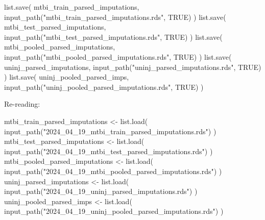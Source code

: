 \documentclass[
  letterpaper,
  DIV=11,
  numbers=noendperiod]{scrreprt}
\newenvironment{Shaded}{\begin{snugshade}}{\end{snugshade}}
\newcommand{\ConstantTok}[1]{\textcolor[rgb]{0.56,0.35,0.01}{#1}}
\newcommand{\FunctionTok}[1]{\textcolor[rgb]{0.28,0.35,0.67}{#1}}
\newcommand{\NormalTok}[1]{\textcolor[rgb]{0.00,0.23,0.31}{#1}}
\newcommand{\OtherTok}[1]{\textcolor[rgb]{0.00,0.23,0.31}{#1}}
\newcommand{\StringTok}[1]{\textcolor[rgb]{0.13,0.47,0.30}{#1}}
\begin{document}
\begin{Shaded}
\begin{Highlighting}[]
\FunctionTok{list.save}\NormalTok{(}
\NormalTok{    mtbi\_train\_parsed\_imputations,}
    \FunctionTok{input\_path}\NormalTok{(}\StringTok{"mtbi\_train\_parsed\_imputations.rds"}\NormalTok{, }\ConstantTok{TRUE}\NormalTok{)}
\NormalTok{)}
\FunctionTok{list.save}\NormalTok{(}
\NormalTok{    mtbi\_test\_parsed\_imputations,}
    \FunctionTok{input\_path}\NormalTok{(}\StringTok{"mtbi\_test\_parsed\_imputations.rds"}\NormalTok{, }\ConstantTok{TRUE}\NormalTok{)}
\NormalTok{)}
\FunctionTok{list.save}\NormalTok{(}
\NormalTok{    mtbi\_pooled\_parsed\_imputations,}
    \FunctionTok{input\_path}\NormalTok{(}\StringTok{"mtbi\_pooled\_parsed\_imputations.rds"}\NormalTok{, }\ConstantTok{TRUE}\NormalTok{)}
\NormalTok{)}
\FunctionTok{list.save}\NormalTok{(}
\NormalTok{    uninj\_parsed\_imputations,}
    \FunctionTok{input\_path}\NormalTok{(}\StringTok{"uninj\_parsed\_imputations.rds"}\NormalTok{, }\ConstantTok{TRUE}\NormalTok{)}
\NormalTok{)}
\FunctionTok{list.save}\NormalTok{(}
\NormalTok{    uninj\_pooled\_parsed\_imps,}
    \FunctionTok{input\_path}\NormalTok{(}\StringTok{"uninj\_pooled\_parsed\_imputations.rds"}\NormalTok{, }\ConstantTok{TRUE}\NormalTok{)}
\NormalTok{)}
\end{Highlighting}
\end{Shaded}

Re-reading:

\begin{Shaded}
\begin{Highlighting}[]
\NormalTok{mtbi\_train\_parsed\_imputations }\OtherTok{\textless{}{-}} \FunctionTok{list.load}\NormalTok{(}
    \FunctionTok{input\_path}\NormalTok{(}\StringTok{"2024\_04\_19\_mtbi\_train\_parsed\_imputations.rds"}\NormalTok{)}
\NormalTok{)}
\NormalTok{mtbi\_test\_parsed\_imputations }\OtherTok{\textless{}{-}} \FunctionTok{list.load}\NormalTok{(}
    \FunctionTok{input\_path}\NormalTok{(}\StringTok{"2024\_04\_19\_mtbi\_test\_parsed\_imputations.rds"}\NormalTok{)}
\NormalTok{)}
\NormalTok{mtbi\_pooled\_parsed\_imputations }\OtherTok{\textless{}{-}} \FunctionTok{list.load}\NormalTok{(}
    \FunctionTok{input\_path}\NormalTok{(}\StringTok{"2024\_04\_19\_mtbi\_pooled\_parsed\_imputations.rds"}\NormalTok{)}
\NormalTok{)}
\NormalTok{uninj\_parsed\_imputations }\OtherTok{\textless{}{-}} \FunctionTok{list.load}\NormalTok{(}
    \FunctionTok{input\_path}\NormalTok{(}\StringTok{"2024\_04\_19\_uninj\_parsed\_imputations.rds"}\NormalTok{)}
\NormalTok{)}
\NormalTok{uninj\_pooled\_parsed\_imps }\OtherTok{\textless{}{-}} \FunctionTok{list.load}\NormalTok{(}
    \FunctionTok{input\_path}\NormalTok{(}\StringTok{"2024\_04\_19\_uninj\_pooled\_parsed\_imputations.rds"}\NormalTok{)}
\NormalTok{)}
\end{Highlighting}
\end{Shaded}
\end{document}
